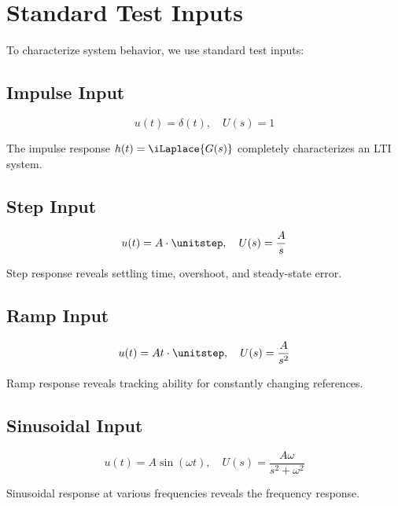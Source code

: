 \chapter{Standard Test Inputs}
\label{ch:test_inputs}

To characterize system behavior, we use standard test inputs:

\section{Impulse Input}

\begin{equation}
u(t) = \delta(t), \quad U(s) = 1
\end{equation}

The impulse response $h(t) = \iLaplace\{G(s)\}$ completely characterizes an LTI system.

\section{Step Input}

\begin{equation}
u(t) = A \cdot \unitstep, \quad U(s) = \frac{A}{s}
\end{equation}

Step response reveals settling time, overshoot, and steady-state error.

\section{Ramp Input}

\begin{equation}
u(t) = At \cdot \unitstep, \quad U(s) = \frac{A}{s^2}
\end{equation}

Ramp response reveals tracking ability for constantly changing references.

\section{Sinusoidal Input}

\begin{equation}
u(t) = A\sin(\omega t), \quad U(s) = \frac{A\omega}{s^2 + \omega^2}
\end{equation}

Sinusoidal response at various frequencies reveals the frequency response.

